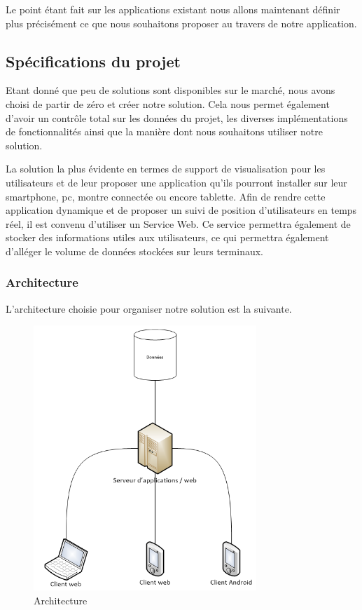 Le point étant fait sur les applications existant nous allons maintenant définir plus précisément ce que nous souhaitons proposer au travers de notre application.


\subsection{Spécifications du projet}

Etant donné que peu de solutions sont disponibles sur le marché, nous avons choisi de partir de zéro et créer notre solution. Cela nous permet également d'avoir un contrôle total sur les données du projet, les diverses implémentations de fonctionnalités ainsi que la manière dont nous souhaitons utiliser notre solution.

La solution la plus évidente en termes de support de visualisation pour les utilisateurs et de leur proposer une application qu'ils pourront installer sur leur smartphone, pc, montre connectée ou encore tablette.
Afin de rendre cette application dynamique et de proposer un suivi de position d'utilisateurs en temps réel, il est convenu d'utiliser un Service Web. Ce service permettra également de stocker des informations utiles aux utilisateurs, ce qui permettra également d'alléger le volume de données stockées sur leurs terminaux.

\subsubsection{Architecture}

L'architecture choisie pour organiser notre solution est la suivante.

\begin{figure}[H]
    \centering
    \includegraphics[height=10cm]{../infrastructure.png}
    \caption{Architecture}
    \label{architecture}
\end{figure}


